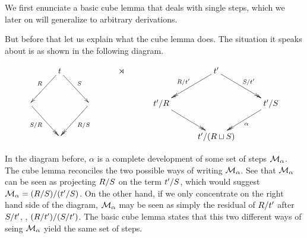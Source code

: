 We first enunciate a basic cube lemma that deals with single steps,
which we later on will generalize to arbitrary derivations.

But before that let us explain what the cube lemma does.
The situation it speaks about is as shown in the following diagram.

\[
\xymatrix@C=1cm{
  & \tm
  \ar[dl]_{\redex} \ar[dr]^{\redextwo}
  &
  & \refinedby
  &
  & \tm'
  \ar@{->>}[dl]_{\redex / \tm'} \ar@{->>}[dr]^{\redextwo / \tm'}
  &
  \\
  \ar@{->>}[dr]_{\redextwo / \redex}
  &
  &
  \ar@{->>}[dl]^{\redex / \redextwo}
  &
  &
  \tm' / \redex
  \ar@{->>}[dr]
  &
  &
  \tm' / \redextwo
  \ar@{->>}[dl]^{\alpha}
  \\
  &
  &
  &
  &
  &
  t'/(R \sqcup S)
  &
  \\
}
\]

In the diagram before, $\alpha$ is a complete development of some set of steps
$\mathcal{M}_\alpha$.
The cube lemma reconciles the two possible ways of writing $\mathcal{M}_\alpha$.
See that $\mathcal{M}_\alpha$ can be seen as projecting $R / S$
on the term $t' / S$, which would suggest
$\mathcal{M}_\alpha = (R / S) / (t' / S)$.
On the other hand, if we only concentrate on the right hand side of the
diagram, $\mathcal{M}_\alpha$ may be seen as simply the residual of $R / t'$
after $S / t'$, \ie, $(R / t') / (S / t')$.
The basic cube lemma states that this two different ways of seing $\mathcal{M}_\alpha$
yield the same set of steps.

